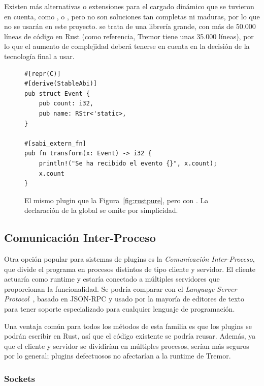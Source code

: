 Existen más alternativas o extensiones para el cargado dinámico que se tuvieron
en cuenta, como ,  o , pero
no son soluciones tan completas ni maduras, por lo que no se usarán en este
proyecto. \abistable se trata de una librería grande, con más de 50.000 líneas
de código en Rust (como referencia, Tremor tiene unas 35.000 líneas), por lo que
el aumento de complejidad deberá tenerse en cuenta en la decisión de la
tecnología final a usar.

\begin{figure}
    \centering
    \begin{verbatim}
#[repr(C)]
#[derive(StableAbi)]
pub struct Event {
    pub count: i32,
    pub name: RStr<'static>,
}

#[sabi_extern_fn]
pub fn transform(x: Event) -> i32 {
    println!("Se ha recibido el evento {}", x.count);
    x.count
}
    \end{verbatim}

    \caption{El mismo plugin que la Figura~\ref{fig:rustpure}, pero con
        \abistable. La declaración de la global  se omite por
        simplicidad.}%
    \label{fig:rustabi_stable}
\end{figure}

\subsection{Comunicación Inter-Proceso}

Otra opción popular para sistemas de plugins es la \emph{Comunicación
Inter-Proceso}, que divide el programa en procesos distintos de tipo cliente y
servidor. El cliente actuaría como runtime y estaría conectado a múltiples
servidores que proporcionan la funcionalidad. Se podría comparar con el
\emph{Language Server Protocol}~\cite{lsp}, basado en JSON-RPC y usado por la
mayoría de editores de texto para tener soporte especializado para cualquier
lenguaje de programación.

Una ventaja común para todos los métodos de esta familia es que los plugins se
podrán escribir en Rust, así que el código existente se podría reusar. Además,
ya que el cliente y servidor se dividirían en múltiples procesos, serían más
seguros por lo general; plugins defectuosos no afectarían a la runtime de
Tremor.

\subsubsection{Sockets}

